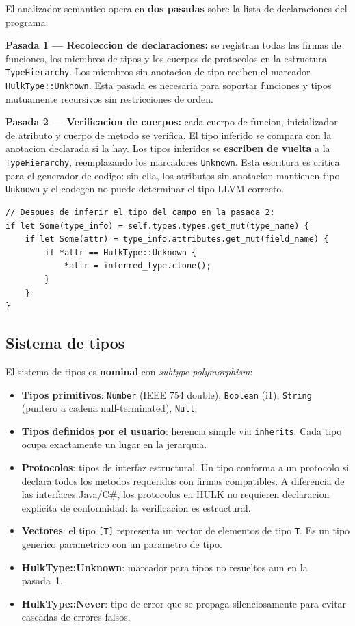 \documentclass[12pt,a4paper]{article}
\begin{document}
El analizador semantico opera en \textbf{dos pasadas} sobre la lista de declaraciones
del programa:

\textbf{Pasada 1 --- Recoleccion de declaraciones:} se registran todas las firmas de
funciones, los miembros de tipos y los cuerpos de protocolos en la estructura
\texttt{TypeHierarchy}. Los miembros sin anotacion de tipo reciben el marcador
\texttt{HulkType::Unknown}. Esta pasada es necesaria para soportar funciones y tipos
mutuamente recursivos sin restricciones de orden.

\textbf{Pasada 2 --- Verificacion de cuerpos:} cada cuerpo de funcion, inicializador
de atributo y cuerpo de metodo se verifica. El tipo inferido se compara con la
anotacion declarada si la hay. Los tipos inferidos se \textbf{escriben de vuelta} a la
\texttt{TypeHierarchy}, reemplazando los marcadores \texttt{Unknown}. Esta escritura
es critica para el generador de codigo: sin ella, los atributos sin anotacion mantienen
tipo \texttt{Unknown} y el codegen no puede determinar el tipo LLVM correcto.

\begin{lstlisting}[style=rust, caption={Fragmento de la escritura de tipos inferidos}]
// Despues de inferir el tipo del campo en la pasada 2:
if let Some(type_info) = self.types.types.get_mut(type_name) {
    if let Some(attr) = type_info.attributes.get_mut(field_name) {
        if *attr == HulkType::Unknown {
            *attr = inferred_type.clone();
        }
    }
}
\end{lstlisting}

\subsection{Sistema de tipos}

El sistema de tipos es \textbf{nominal} con \textit{subtype polymorphism}:

\begin{itemize}
  \item \textbf{Tipos primitivos}: \texttt{Number} (IEEE 754 double), \texttt{Boolean}
    (i1), \texttt{String} (puntero a cadena null-terminated), \texttt{Null}.
  \item \textbf{Tipos definidos por el usuario}: herencia simple via \texttt{inherits}.
    Cada tipo ocupa exactamente un lugar en la jerarquia.
  \item \textbf{Protocolos}: tipos de interfaz estructural. Un tipo conforma a un
    protocolo si declara todos los metodos requeridos con firmas compatibles. A
    diferencia de las interfaces Java/C\#, los protocolos en HULK no requieren
    declaracion explicita de conformidad: la verificacion es estructural.
  \item \textbf{Vectores}: el tipo \texttt{[T]} representa un vector de elementos de
    tipo \texttt{T}. Es un tipo generico parametrico con un parametro de tipo.
  \item \textbf{HulkType::Unknown}: marcador para tipos no resueltos aun en la pasada~1.
  \item \textbf{HulkType::Never}: tipo de error que se propaga silenciosamente para
    evitar cascadas de errores falsos.
\end{itemize}
\end{document}
